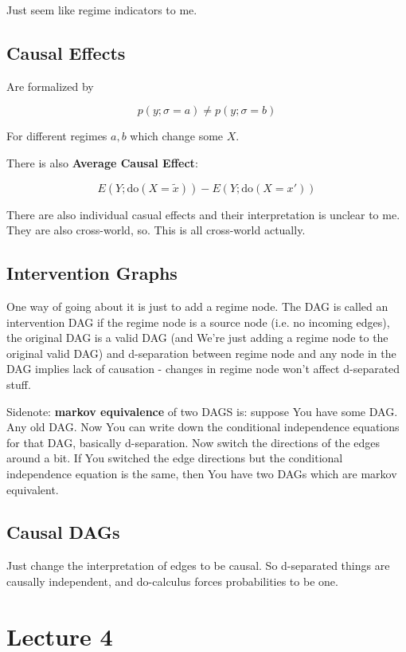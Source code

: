 \documentclass{article}
\begin{document}
			Just seem like regime indicators to me. 
			
		\subsection{Causal Effects}
		
			Are formalized by
			
			\[ p(y;\sigma= a) \neq p(y;\sigma = b) \]
		 
		 	For different regimes $a, b$ which change some $X$. 
		 	
		 	There is also \textbf{Average Causal Effect}:
		 	
			\[ E(Y;\text{do}(X = \tilde{x})) - E(Y;\text{do}(X = x')) \]
		 
		 	There are also individual casual effects and their interpretation is unclear to me. They are also cross-world, so. This is all cross-world actually.
		 	
		\subsection{Intervention Graphs}
		
			One way of going about it is just to add a regime node. The DAG is called an intervention DAG if the regime node is a source node (i.e. no incoming edges), the original DAG is a valid DAG (and We're just adding a regime node to the original valid DAG) and d-separation between regime node and any node in the DAG implies lack of causation - changes in regime node won't affect d-separated stuff. 
			
			Sidenote: \textbf{markov equivalence} of two DAGS is: suppose You have some DAG. Any old DAG. Now You can write down the conditional independence equations for that DAG, basically d-separation. Now switch the directions of the edges around a bit. If You switched the edge directions but the conditional independence equation is the same, then You have two DAGs which are markov equivalent.
			
		\subsection{Causal DAGs}
		
			Just change the interpretation of edges to be causal. So d-separated things are causally independent, and do-calculus forces probabilities to be one. 
			
\section{Lecture 4}
\end{document}
